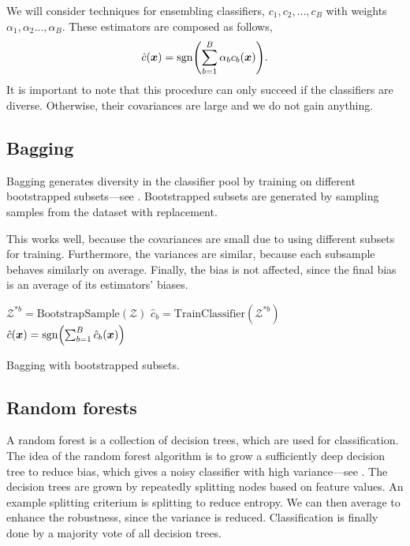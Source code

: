 We will consider techniques for ensembling classifiers, $c_1, c_2, \ldots, c_B$ with weights
$\alpha_1, \alpha_2 \ldots, \alpha_B$. These estimators are composed as follows, \[
    \hat{c}(\vec{x}) = \mathrm{sgn} \lft( \sum_{b=1}^{B} \alpha_b c_b(\vec{x}) \rgt).
\]
It is important to note that this procedure can only succeed if the classifiers are diverse.
Otherwise, their covariances are large and we do not gain anything.

\subsection{Bagging}

Bagging generates diversity in the classifier pool by training on different bootstrapped
subsets---see . Bootstrapped subsets are generated by sampling \iid samples
from the dataset with replacement.

This works well, because the covariances are small due to using different subsets for training.
Furthermore, the variances are similar, because each subsample behaves similarly on average.
Finally, the bias is not affected, since the final bias is an average of its estimators' biases.

\begin{algorithm}[t]
    \begin{algorithmic}[1]
        \State $\mathcal{Z}^{*b} = \mathrm{BootstrapSample}(\mathcal{Z})$
        \State $\hat{c}_b = \mathrm{TrainClassifier}(\mathcal{Z}^{*b})$
        \EndFor
        \State \Return $\hat{c}(\vec{x}) = \mathrm{sgn}\lft( \sum_{b=1}^{B} \hat{c}_b(\vec{x}) \rgt)$
    \end{algorithmic}
    \label{alg:bootstrap}
    \caption{Bagging with bootstrapped subsets.}
\end{algorithm}

\subsection{Random forests}

A random forest is a collection of decision trees, which are used for classification. The idea of
the random forest algorithm is to grow a sufficiently deep decision tree to reduce bias, which
gives a noisy classifier with high variance---see . The decision trees are
grown by repeatedly splitting nodes based on feature values. An example splitting criterium is
splitting to reduce entropy. We can then average to enhance the robustness, since the variance is
reduced. Classification is finally done by a majority vote of all decision trees.

